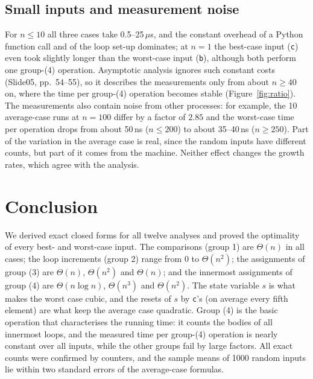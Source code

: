 \documentclass[11pt]{article}
\theoremstyle{remark}
\newcommand{\tb}{\texttt{b}}
\newcommand{\tc}{\texttt{c}}
\begin{document}
\subsection{Small inputs and measurement noise}
\label{sec:noise}
For $n\le 10$ all three cases take 0.5--25\,$\mu$s, and the constant overhead of a Python function call and of the
loop set-up dominates; at $n=1$ the best-case input (\tc) even took slightly longer than the worst-case input (\tb),
although both perform one group-(4) operation. Asymptotic analysis ignores such constant costs
(Slide05, pp.~54--55), so it describes the measurements only from about $n\ge40$ on, where the time per group-(4)
operation becomes stable (Figure~\ref{fig:ratio}). The measurements also contain noise from other processes: for
example, the 10 average-case runs at $n=100$ differ by a factor of $2.85$ and the worst-case time per operation drops
from about 50\,ns ($n\le 200$) to about 35--40\,ns ($n\ge 250$). Part of the variation in the average case is real,
since the random inputs have different counts, but part of it comes from the machine. Neither effect changes the
growth rates, which agree with the analysis.

\section{Conclusion}
We derived exact closed forms for all twelve analyses and proved the optimality of every best- and worst-case input.
The comparisons (group 1) are $\Theta(n)$ in all cases; the loop increments (group 2) range from $0$ to $\Theta(n^2)$;
the assignments of group (3) are $\Theta(n)$, $\Theta(n^2)$ and $\Theta(n)$; and the innermost assignments of group (4)
are $\Theta(n\log n)$, $\Theta(n^3)$ and $\Theta(n^2)$. The state variable $s$ is what makes the worst case cubic, and
the resets of $s$ by \tc's (on average every fifth element) are what keep the average case quadratic. Group (4) is the
basic operation that characterises the running time: it counts the bodies of all innermost loops, and the measured time
per group-(4) operation is nearly constant over all inputs, while the other groups fail by large factors. All exact
counts were confirmed by counters, and the sample means of 1000 random inputs lie within two standard errors of the
average-case formulas.
\end{document}
